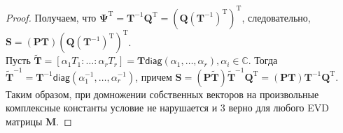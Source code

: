 \documentclass[specialist, substylefile = spbureport.rtx, subf,href,colorlinks=true, 12pt]{disser}
\theoremstyle{definition}
\begin{document}
\begin{proof}
Получаем, что $\mathbf{\Psi}^{\mathrm{T}} = \mathbf{T}^{-1}\mathbf{Q}^{\mathrm{T}} = (\mathbf{Q}(\mathbf{T}^{-1})^{\mathrm{T}})^{\mathrm{T}}$, следовательно, $\mathbf{S} = (\mathbf{PT})(\mathbf{Q}(\mathbf{T}^{-1})^{\mathrm{T}})^{\mathrm{T}}$. \\
\hspace*{0.5cm} Пусть $\widetilde{\mathbf{T}} = [\alpha_1T_1: \dots :\alpha_rT_r] = \mathbf{T}\mathsf{diag}(\alpha_1, \dots ,\alpha_r), \alpha_i \in \mathbb{C}$. Тогда $\widetilde{\mathbf{T}}^{-1} = \mathbf{T}^{-1}\mathsf{diag}(\alpha_1^{-1}, \dots ,\alpha_r^{-1})$, причем $\mathbf{S} = (\mathbf{P}\widetilde{\mathbf{T}})\widetilde{\mathbf{T}}^{-1}\mathbf{Q}^{\mathrm{T}} = (\mathbf{P}\mathbf{T})\mathbf{T}^{-1}\mathbf{Q}^{\mathrm{T}}$. Таким образом, при домножении собственных векторов
на произвольные комплексные константы условие не нарушается и 3
верно для любого EVD матрицы $\mathbf{M}$.
\end{proof}
\end{document}
